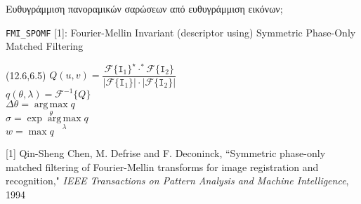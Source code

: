 \begin{frame}{Ευθυγράμμιση πανοραμικών σαρώσεων από ευθυγράμμιση εικόνων;}

  {\small
  \texttt{FMI\_SPOMF} [1]: Fourier-Mellin Invariant (descriptor using) Symmetric Phase-Only Matched Filtering
  }

  \begin{figure}
    
  \end{figure}


\begin{textblock}{14}(12.6,6.5)
{\tiny $Q(u,v) = \dfrac{\mathcal{F}\{\texttt{I}_1\}^{\star} \cdot^\ast \mathcal{F}\{\texttt{I}_2\}}{|\mathcal{F}\{\texttt{I}_1\}| \cdot |\mathcal{F}\{\texttt{I}_2\}|}$}\\
{\tiny $q(\theta, \lambda) = \mathcal{F}^{-1}\{Q\}$}\\
{\tiny $\Delta \theta = \operatorname*{arg\,max}\limits_\theta q$}\\
{\tiny $\sigma = \exp{\operatorname*{arg\,max}\limits_\lambda q}$}\\
{\tiny $w = \max q$}
\end{textblock}

  \placebottom
  \tiny
  [1] Qin-Sheng Chen, M. Defrise and F. Deconinck, ``Symmetric phase-only matched filtering of Fourier-Mellin transforms for image registration and recognition," \textit{IEEE Transactions on Pattern Analysis and Machine Intelligence}, 1994




\end{frame}
